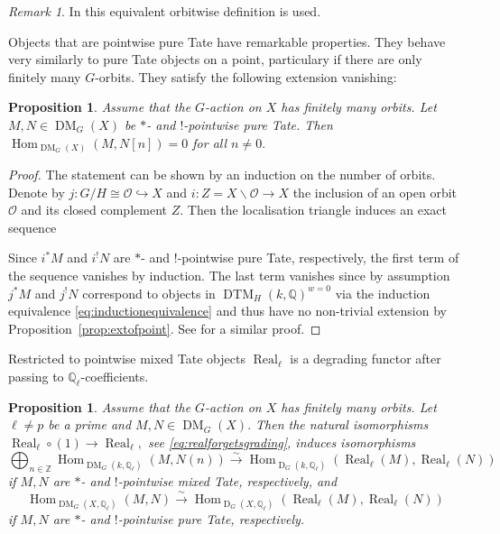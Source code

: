 \documentclass{amsart}
\theoremstyle{plain}
\newtheorem{proposition}[theorem]{Proposition}
\theoremstyle{TheoremNum}
\theoremstyle{definition}
\theoremstyle{remark}
\newtheorem{remark}[theorem]{Remark}
\numberwithin{equation}{section}
\newcommand{\Q}{\mathbb{Q}}
\newcommand{\Z}{\mathbb{Z}}
\newcommand{\DM}{\operatorname{DM}}
\newcommand{\DTM}{\operatorname{DTM}}
\newcommand{\Hom}{\operatorname{Hom}}
\newcommand{\Real}{\operatorname{Real}}
\newcommand{\DerG}{\operatorname{D}}
\begin{document}
\begin{remark} In \cite{soergel_equivariant_2018} this equivalent orbitwise definition is used.
\end{remark}
Objects that are pointwise pure Tate have remarkable properties. They behave very similarly to pure Tate objects on a point, particulary if there are only finitely many $G$-orbits. They satisfy the following extension vanishing:
\begin{proposition}\label{prop:homvanishingpure} Assume that the $G$-action on $X$ has finitely many orbits. Let $M,N\in \DM_G(X)$ be $*$- and $!$-pointwise pure Tate. Then $\Hom_{\DM_G(X)}(M,N[n])=0$ for all $n\neq 0.$ 
\end{proposition}
\begin{proof} The statement can be shown by an induction on the number of orbits. Denote by $j:G/H\cong\mathcal{O}\hookrightarrow X$ and $i:Z=X\backslash \mathcal{O}\to X$ the inclusion of an open orbit $\mathcal{O}$ and its closed complement $Z.$ Then the localisation triangle induces an exact sequence
\begin{center}
\end{center}
Since $i^*M$ and $i^!N$ are $*$- and $!$-pointwise pure Tate, respectively, the first term of the sequence vanishes by induction. The last term vanishes since by assumption $j^*M$ and $j^!N$ correspond to objects in $\DTM_H(k,\Q)^{w=0}$ via the induction equivalence \eqref{eq:inductionequivalence} and thus have no non-trivial extension by Proposition~\ref{prop:extofpoint}. See \cite[Corollary II.4.19]{soergel_equivariant_2018} for a similar proof.
\end{proof}
Restricted to pointwise mixed Tate objects $\Real_\ell$ is a degrading functor after passing to $\Q_\ell$-coefficients.
\begin{proposition}\label{prop:gradedhompure}  Assume that the $G$-action on $X$ has finitely many orbits. Let $\ell\neq p$ be a prime and $M,N\in \DM_G(X).$  Then the natural isomorphisms $\Real_\ell\circ(1)\to\Real_\ell,$ see \eqref{eq:realforgetsgrading}, induces isomorphisms
$$\bigoplus_{n\in\Z}\Hom_{\DM_G(k,\Q_\ell)}(M,N(n))\stackrel{\sim}{\to} \Hom_{\DerG_G(k,\Q_\ell)}(\Real_\ell(M),\Real_\ell(N))$$ 
 if $M,N$  are $*$- and $!$-pointwise mixed Tate, respectively, and
$$\Hom_{\DM_G(X,\Q_\ell)}(M,N)\stackrel{\sim}{\to} \Hom_{\DerG_G(X,\Q_\ell)}(\Real_\ell(M),\Real_\ell(N))$$
if $M,N$ are $*$- and $!$-pointwise pure Tate, respectively.
\end{proposition}
\end{document}
